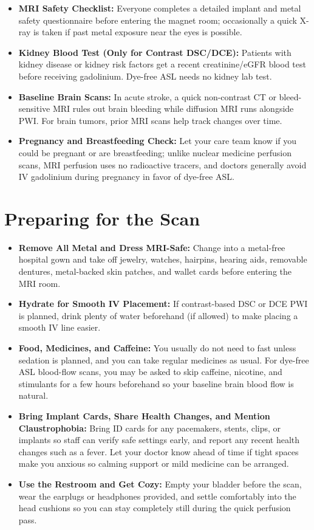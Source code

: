 \begin{itemize}
    \item \textbf{MRI Safety Checklist:} Everyone completes a detailed implant and metal safety questionnaire before entering the magnet room; occasionally a quick X-ray is taken if past metal exposure near the eyes is possible.
    \item \textbf{Kidney Blood Test (Only for Contrast DSC/DCE):} Patients with kidney disease or kidney risk factors get a recent creatinine/eGFR blood test before receiving gadolinium. Dye-free ASL needs no kidney lab test.
    \item \textbf{Baseline Brain Scans:} In acute stroke, a quick non-contrast CT or bleed-sensitive MRI rules out brain bleeding while diffusion MRI runs alongside PWI. For brain tumors, prior MRI scans help track changes over time.
    \item \textbf{Pregnancy and Breastfeeding Check:} Let your care team know if you could be pregnant or are breastfeeding; unlike nuclear medicine perfusion scans, MRI perfusion uses no radioactive tracers, and doctors generally avoid IV gadolinium during pregnancy in favor of dye-free ASL.
\end{itemize}

\section{Preparing for the Scan}

\begin{itemize}
    \item \textbf{Remove All Metal and Dress MRI-Safe:} Change into a metal-free hospital gown and take off jewelry, watches, hairpins, hearing aids, removable dentures, metal-backed skin patches, and wallet cards before entering the MRI room.
    \item \textbf{Hydrate for Smooth IV Placement:} If contrast-based DSC or DCE PWI is planned, drink plenty of water beforehand (if allowed) to make placing a smooth IV line easier.
    \item \textbf{Food, Medicines, and Caffeine:} You usually do not need to fast unless sedation is planned, and you can take regular medicines as usual. For dye-free ASL blood-flow scans, you may be asked to skip caffeine, nicotine, and stimulants for a few hours beforehand so your baseline brain blood flow is natural.
    \item \textbf{Bring Implant Cards, Share Health Changes, and Mention Claustrophobia:} Bring ID cards for any pacemakers, stents, clips, or implants so staff can verify safe settings early, and report any recent health changes such as a fever. Let your doctor know ahead of time if tight spaces make you anxious so calming support or mild medicine can be arranged.
    \item \textbf{Use the Restroom and Get Cozy:} Empty your bladder before the scan, wear the earplugs or headphones provided, and settle comfortably into the head cushions so you can stay completely still during the quick perfusion pass.
\end{itemize}

